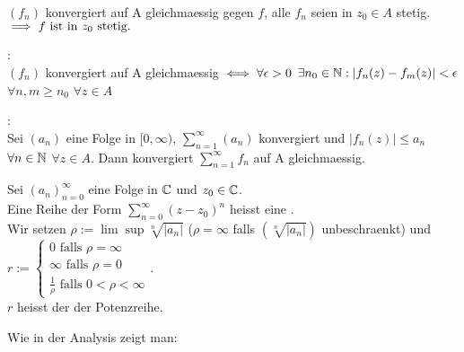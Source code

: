 \documentclass[a4paper,twoside,DIV15,BCOR12mm]{scrbook}
\def\gdw{\equizu}
\def\gdw{\equizu}
\begin{document}
\begin{satz}
 \begin{liste}
  \item $(f_n)$ konvergiert auf A gleichmaessig gegen $f$, alle $f_n$ seien in $z_0 \in A$ stetig. 
    $\implies f \text{ ist in } z_0 \text{ stetig.} $
  \item {}:\\ $(f_n)$ konvergiert auf A gleichmaessig $\gdw \forall\epsilon>0 $ $\exists n_0\in\mathbb{N}:|f_n(z)-f_m(z)|<\epsilon $ $\forall n,m \ge n_0 $ $\forall z\in A$
  \item {}: \\ Sei $(a_n)$ eine Folge in $[0,\infty)$, $\sum\limits_{n=1}^\infty (a_n)$ konvergiert und $|f_n(z)|  \leq a_n $ $\forall n\in\mathbb{N} $ $\forall z\in A$. Dann konvergiert $\sum\limits_{n=1}^\infty f_n$ auf A gleichmaessig.
 \end{liste}
\end{satz}

\begin{definition}
 Sei $(a_n)_{n=0}^\infty$ eine Folge in $\mathbb{C}$ und $z_0 \in \mathbb{C}$. \\
 Eine Reihe der Form $\sum\limits_{n=0}^\infty(z-z_0)^n $ heisst eine . \\
 Wir setzen $\rho :=\lim\sup \sqrt[n]{|a_n|}$ ($\rho = \infty$ falls $(\sqrt[n]{|a_n|})$ unbeschraenkt) und \\
 $r:=\begin{cases} 0 \text{ falls } \rho = \infty \\ \infty \text{ falls } \rho = 0 \\ \frac{1}{\rho} \text{ falls } 0<\rho<\infty \end{cases}$. \\ $r$ heisst der  der Potenzreihe.
\end{definition}
Wie in der Analysis zeigt man:
\end{document}
